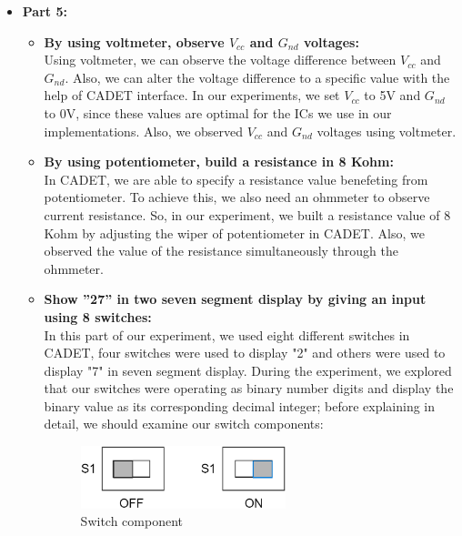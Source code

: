 \documentclass[pdftex,12pt,a4paper]{article}
\begin{document}
\begin{itemize}
    \item \textbf{Part 5:}
    \begin{itemize}
        \item \textbf{By using voltmeter, observe $V_{cc}$ and $G_{nd}$ voltages:}\\
    Using voltmeter, we can observe the voltage difference between $V_{cc}$ and $G_{nd}$. Also, we can alter the voltage difference to a specific value with the help of CADET interface. In our experiments, we set $V_{cc}$ to 5V and $G_{nd}$ to 0V, since these values are optimal for the ICs we use in our implementations. Also, we observed $V_{cc}$ and $G_{nd}$ voltages using voltmeter.
    \end{itemize}
    \begin{itemize}
        \item \textbf{By using potentiometer, build a resistance in 8 Kohm:}\\
    In CADET, we are able to specify a resistance value benefeting from potentiometer. To achieve this, we also need an ohmmeter to observe current resistance. So, in our experiment, we built a resistance value of 8 Kohm by adjusting the wiper of potentiometer in CADET. Also, we observed the value of the resistance simultaneously through the ohmmeter.
    \end{itemize}
    \begin{itemize}
        \item \textbf{Show ”27” in two seven segment display by giving an input using 8 switches:}\\
    In this part of our experiment, we used eight different switches in CADET, four switches were used to display "2" and others were used to display "7" in seven segment display. During the experiment, we explored that our switches were operating as binary number digits and display the binary value as its corresponding decimal integer; before explaining in detail, we should examine our switch components:\\
    \begin{figure}[H]
    \centering
        \includegraphics[width=0.6\textwidth]{switch.png}	
        \caption{Switch component}
        \label{fig1}
   \end{figure}
   

\end{itemize}
\end{itemize}
\end{document}
